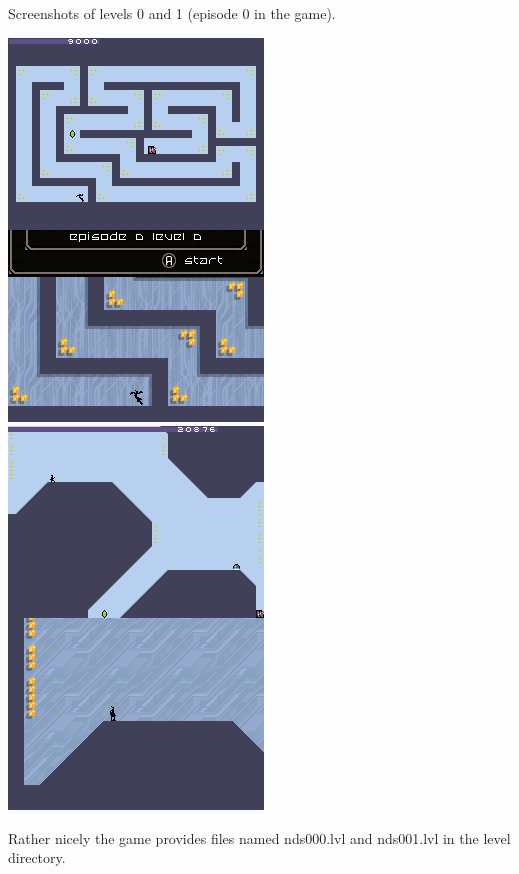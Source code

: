 \documentclass[
]{book}
\begin{document}
Screenshots of levels 0 and 1 (episode 0 in the game).

\includegraphics{images/168_home_fast6191_romhackingguide_unrenamed_fil___ers_romhackingguideleveleditingworkedNplus1.png}\includegraphics{images/169_home_fast6191_romhackingguide_unrenamed_fil___ers_romhackingguideleveleditingworkedNplus2.png}

Rather nicely the game provides files named nds000.lvl and nds001.lvl in the level directory.
\end{document}
